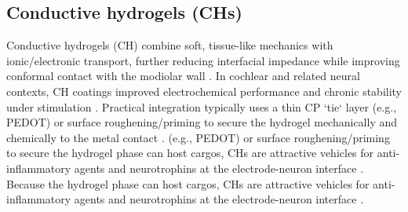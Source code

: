 \documentclass[referee,pdflatex, sn-vancouver-num]{sn-jnl}%
\theoremstyle{thmstyleone}%
\theoremstyle{thmstyletwo}%
\theoremstyle{thmstylethree}%
\begin{document}
\subsection{Conductive hydrogels (CHs)}
Conductive hydrogels (CH) combine soft, tissue-like mechanics with ionic/electronic transport, further reducing interfacial impedance while improving conformal contact with the modiolar wall \cite{Green2012}. In cochlear and related neural contexts, CH coatings improved electrochemical performance and chronic stability under stimulation \cite{Hassarati2014,Dalrymple2020,Hyakumura2021}. Practical integration typically uses a thin CP `tie` layer (e.g., PEDOT) or surface roughening/priming to secure the hydrogel mechanically and chemically to the metal contact \cite{Kleber2017,Chhin2018}. (e.g., PEDOT) or surface roughening/priming to secure the hydrogel phase can host cargos, CHs are attractive vehicles for anti-inflammatory agents and neurotrophins at the electrode-neuron interface \cite{Green2012,Hassarati2014}. Because the hydrogel phase can host cargos, CHs are attractive vehicles for anti-inflammatory agents and neurotrophins at the electrode-neuron interface \cite{Hassarati2014}.
\end{document}
